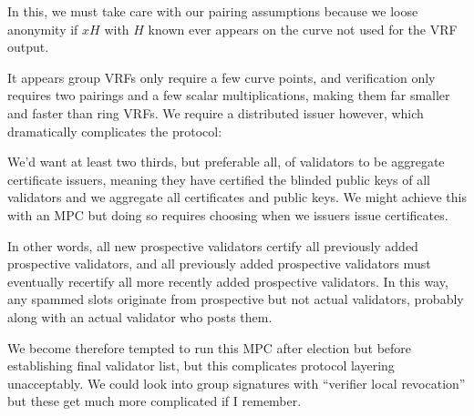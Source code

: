 In this, we must take care with our pairing assumptions because we loose anonymity if $x H$ with $H$ known ever appears on the curve not used for the VRF output.  

It appears group VRFs only require a few curve points, and verification only requires two pairings and a few scalar multiplications, making them far smaller and faster than ring VRFs.  We require a distributed issuer however, which dramatically complicates the protocol:

We'd want at least two thirds, but preferable all, of validators to be aggregate certificate issuers, meaning they have certified the blinded public keys of all validators and we aggregate all certificates and public keys.  We might achieve this with an MPC but doing so requires choosing when we issuers issue certificates.  

In other words, all new prospective validators certify all previously added prospective validators, and all previously added prospective validators must eventually recertify all more recently added prospective validators.  In this way, any spammed slots originate from prospective but not actual validators, probably along with an actual validator who posts them.  

We become therefore tempted to run this MPC after election but before establishing final validator list, but this complicates protocol layering unacceptably.  We could look into group signatures with ``verifier local revocation'' but these get much more complicated if I remember.




